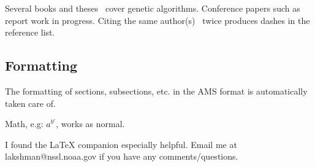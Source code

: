 \documentclass[twocolumn]{article}
\begin{document}
Several books and theses~\citep{goldberg, dejong} cover genetic algorithms.
Conference papers such as \citet{annie} report work in progress.
Citing the same author(s)~\citep{aires} twice produces dashes in the reference
list.

\subsection{Formatting}
The formatting of sections, subsections, etc.
in the AMS format is automatically taken care of.

Math, e.g: $a^{b^c}$, works as normal.


\begin{acknowledgement}
I found the LaTeX companion especially helpful.
Email me at lakshman@nssl.noaa.gov if you have any comments/questions.
\end{acknowledgement}


\end{document}
